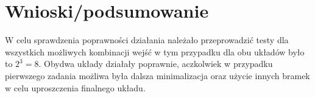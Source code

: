 \documentclass[12pt,a4paper]{article}
\begin{document}
	\section{Wnioski/podsumowanie}
	
	W celu sprawdzenia poprawności działania należało przeprowadzić testy dla wszystkich możliwych kombinacji wejść w tym przypadku dla obu układów było to $2^3 = 8$. Obydwa układy działały poprawnie, aczkolwiek w przypadku pierwszego zadania możliwa była dalsza minimalizacja oraz użycie innych bramek w celu uproszczenia finalnego układu. 
	
\end{document}
